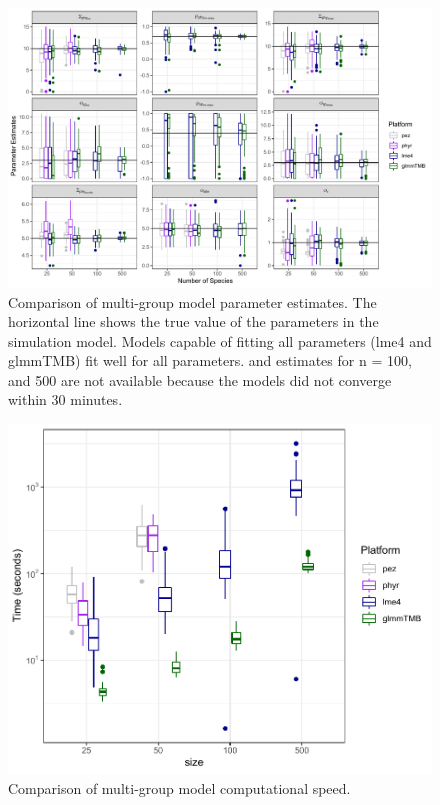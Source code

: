 \documentclass[12pt]{article}
\begin{document}
\begin{center}
\begin{figure}[H]
  \includegraphics[scale=0.7,page=1]{./figure/msplot.pdf}
  \caption{Comparison of multi-group model parameter estimates. The horizontal line shows the true value of the parameters in the simulation model. Models capable of fitting all parameters (lme4 and glmmTMB) fit well for all parameters.  and  estimates for n = 100, and 500 are not available because the models did not converge within 30 minutes. 
  }
  \label{msplot}
\end{figure}
\end{center}


\begin{center}
\begin{figure}[H]
  \includegraphics[scale=0.8]{./figure/mstime.pdf}
  \caption{Comparison of multi-group model computational speed.}
  \label{msplot_time}
\end{figure}
\end{center}
\end{document}
